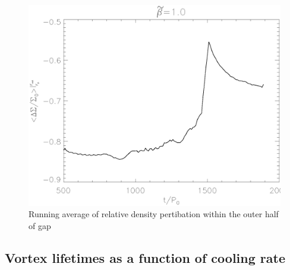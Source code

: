 \begin{figure}
    \includegraphics[width=\linewidth]{figures/gapdepth}
 \caption{Running average of relative density pertibation within the outer half
 of gap} \label{gapdepth}
\end{figure}

\subsection{Vortex lifetimes as a function of cooling rate}

